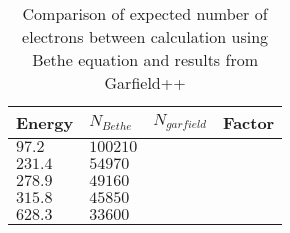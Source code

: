 \begin{table}[ht]%
	\centering
	\caption[Comparison of expected number of electrons between calculation using Bethe equation and results from Garfield++.]
	{Comparison of expected number of electrons between calculation using Bethe equation and results from Garfield++}
	\label{chap3:GarfieldBethe}
	\begin{tabular}{llll}
		\toprule
		Energy    & \(N_{Bethe}\) & \(N_{garfield}\) & Factor \\
		\midrule
		\(97.2\)  & \(100210\)    & \(\)             & \(\)   \\
		\(231.4\) & \(54970\)     & \(\)             & \(\)   \\
		\(278.9\) & \(49160\)     & \(\)             & \(\)   \\
		\(315.8\) & \(45850\)     & \(\)             & \(\)   \\
		\(628.3\) & \(33600\)     & \(\)             & \(\)   \\
		\bottomrule
	\end{tabular}
\end{table}